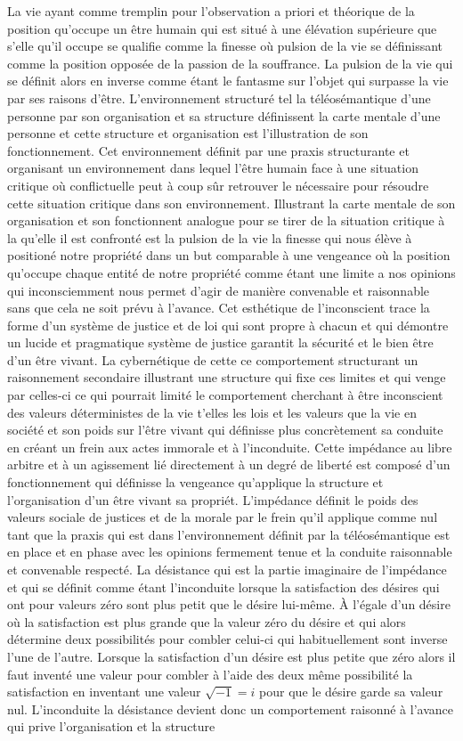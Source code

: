 \documentclass[12pt,letterpaper,oneside]{article}
\begin{document}
La vie ayant comme tremplin pour l’observation a priori et théorique de la position qu’occupe un être humain qui est situé à une élévation supérieure que s’elle qu’il occupe se qualifie comme la finesse où pulsion de la vie se définissant comme la position opposée de la passion de la souffrance. La pulsion de la vie qui se définit alors en inverse comme étant le fantasme sur l’objet qui surpasse la vie par ses raisons d’être. L’environnement structuré tel la téléosémantique d’une personne par son organisation et sa structure définissent la carte mentale d’une personne et cette structure et organisation est l’illustration de son fonctionnement. Cet environnement définit par une praxis structurante et organisant un environnement dans lequel l’être humain face à une situation critique où conflictuelle peut à coup sûr retrouver le nécessaire pour résoudre cette situation critique dans son environnement. Illustrant la carte mentale de son organisation et son fonctionnent analogue pour se tirer de la situation critique à la qu’elle il est confronté est la pulsion de la vie la finesse qui nous élève à positioné notre propriété dans un but comparable à une vengeance où la position qu’occupe chaque entité de notre propriété comme étant une limite a nos opinions qui inconsciemment nous permet d’agir de manière convenable et raisonnable sans que cela ne soit prévu à l’avance. Cet esthétique de l’inconscient trace la forme d’un système de justice et de loi qui sont propre à chacun et qui démontre un lucide et pragmatique système de justice garantit la sécurité et le bien être d’un être vivant.  La cybernétique de cette ce comportement structurant un raisonnement secondaire illustrant une structure qui fixe ces limites et qui venge par celles-ci ce qui pourrait limité le comportement cherchant à être inconscient des valeurs déterministes de la vie t’elles les lois et les valeurs que la vie en société et son poids sur l’être vivant qui définisse plus concrètement sa conduite en créant un frein aux actes immorale et à l’inconduite. Cette impédance au libre arbitre et à un agissement lié directement à un degré de liberté est composé d’un fonctionnement qui définisse la vengeance qu’applique la structure et l’organisation d’un être vivant sa propriét. L’impédance définit le poids des valeurs sociale de justices et de la morale par le frein qu’il applique comme nul tant que la praxis qui est dans l’environnement définit par la téléosémantique est en place et en phase avec les opinions fermement tenue et la conduite raisonnable et convenable respecté. La désistance qui est la partie imaginaire de l’impédance et qui se définit comme étant l’inconduite lorsque la satisfaction des désires qui ont pour valeurs zéro sont plus petit que le désire lui-même. À l’égale d’un désire où la satisfaction  est plus grande que la valeur zéro du désire et qui alors détermine deux possibilités pour combler celui-ci qui habituellement sont inverse l’une de l’autre. Lorsque la satisfaction d’un désire est plus petite que zéro alors il faut inventé une valeur pour combler à l’aide des deux même possibilité la satisfaction en inventant une valeur $\sqrt{-1}=i$  pour que le désire garde sa valeur nul. L’inconduite la désistance devient donc un comportement raisonné à l’avance qui prive l’organisation et la structure 
\end{document}
